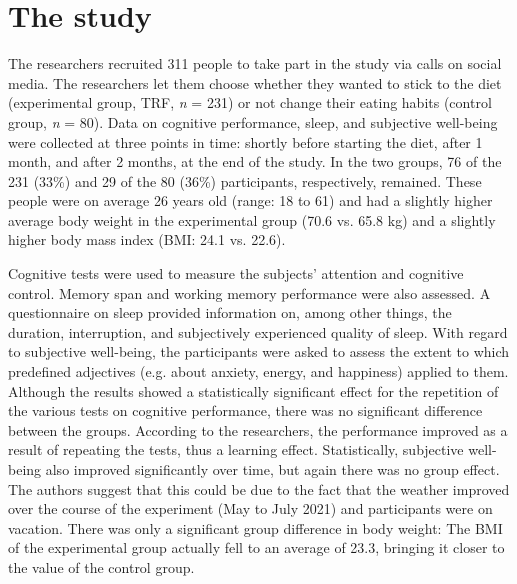 \documentclass[authordate, empirical]{jote-new-article}
\begin{document}
\section{The study}






The researchers recruited 311 people to take part in the study via calls on social media. The researchers let them choose whether they wanted to stick to the diet (experimental group, TRF, \emph{n }= 231) or not change their eating habits (control group, \emph{n }= 80). Data on cognitive performance, sleep, and subjective well-being were collected at three points in time: shortly before starting the diet, after 1 month, and after 2 months, at the end of the study. In the two groups, 76 of the 231 (33\%) and 29 of the 80 (36\%) participants, respectively, remained. These people were on average 26 years old (range: 18 to 61) and had a slightly higher average body weight in the experimental group (70.6 vs. 65.8 kg) and a slightly higher body mass index (BMI: 24.1 vs. 22.6).







Cognitive tests were used to measure the subjects' attention and cognitive control. Memory span and working memory performance were also assessed. A questionnaire on sleep provided information on, among other things, the duration, interruption, and subjectively experienced quality of sleep. With regard to subjective well-being, the participants were asked to assess the extent to which predefined adjectives (e.g. about anxiety, energy, and happiness) applied to them. Although the results showed a statistically significant effect for the repetition of the various tests on cognitive performance, there was no significant difference between the groups. According to the researchers, the performance improved as a result of repeating the tests, thus a learning effect. Statistically, subjective well-being also improved significantly over time, but again there was no group effect. The authors suggest that this could be due to the fact that the weather improved over the course of the experiment (May to July 2021) and participants were on vacation. There was only a significant group difference in body weight: The BMI of the experimental group actually fell to an average of 23.3, bringing it closer to the value of the control group.
\end{document}
